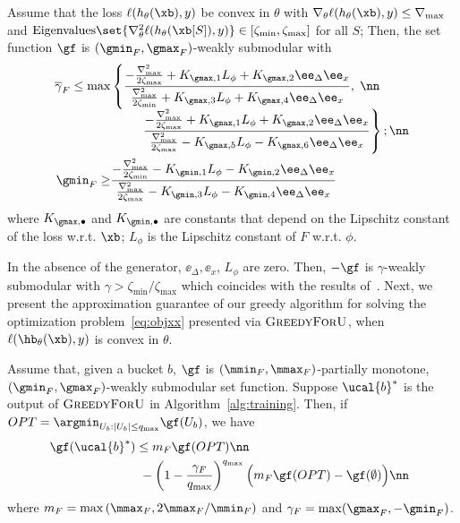 \documentclass[letterpaper]{article}
\renewcommand{\cite}{\citep}
\begin{document}
\begin{theorem} Assume that the loss $\ell(h_{\theta}(\xb),y)$  be convex in $\theta$ with
$\nabla_{\theta}\ell(h_{\theta}(\xb),y) \le \nabla_{\max}$
and $\text{Eigenvalues}\set{\nabla^2 _{\theta} \ell(h_{\theta}(\xb[S]),y)} \in [\zeta_{\min}, \zeta_{\max}]$ for all $S$;
Then,
\label{thm:sub}
the set function $\gf$  is $(\gmin_F,\gmax_F)$-weakly submodular
with
\begin{align}
 \hspace{-2mm}\overline{\gamma}_F \le \max&\left\{  \frac{   -\frac{\nabla_{\max} ^2}{2\zeta_{\max}}+ K_{\gmax,1} L_\phi  + K_{\gmax,2} \ee_{\Delta} \ee_x  }{\frac{\nabla_{\max} ^2}{2\zeta_{\min}}+ K_{\gmax,3} L_\phi   + K_{\gmax,4}  \ee_{\Delta} \ee_x   }, \right. \nn\\[-1ex]
& \qquad \ \left.  \frac{    -\frac{\nabla_{\max} ^2}{2\zeta_{\max}}+ K_{\gmax,1} L_\phi  + K_{\gmax,2} \ee_{\Delta} \ee_x  }{\frac{\nabla_{\max} ^2}{2\zeta_{\max}}- K_{\gmax,5}L_\phi -K_{\gmax,6} \ee_{\Delta} \ee_x  }
 \right\}; \nn\\
 \gmin_F \ge
& \frac{   -\frac{\nabla_{\max} ^2}{2\zeta_{\min}}- K_{\gmin,1} L_\phi - K_{\gmin,2} \ee_{\Delta} \ee_x  }{\frac{ \nabla_{\max} ^2}{2\zeta_{\max}}- K_{\gmin,3} L_\phi  -  K_{\gmin,4} \ee_{\Delta} \ee_x    }
\end{align}
where $K_{\gmax,\bullet}$ and $K_{\gmin, \bullet}$ are constants that depend on the Lipschitz constant of the loss w.r.t. $\xb$; $L_{\phi}$ is the Lipschitz constant of $F$ w.r.t. $\phi$.
\end{theorem}
In the absence of the generator, $\ee_\Delta, \ee_x$, $L_{\phi}$ are zero. Then, $-\gf$ is $\gamma$-weakly submodular with $\gamma > \zeta_{\min}/\zeta_{\max}$ which coincides with the results of~\cite{elenberg2018restricted}.
%
Next, we present the approximation guarantee of our greedy algorithm for solving the optimization problem~\eqref{eq:objxx} presented via $\textsc{GreedyForU}$, when $\ell(\hb_{\theta} (\xb),y)$ is convex in $\theta$.
\begin{theorem} Assume that, given a bucket $b$,  $\gf$ is  $(\mmin_F,\mmax_F)$-partially monotone, $(\gmin_F,\gmax_F)$-weakly submodular set function. Suppose $\ucal{b}^*$ is
the output of $\textsc{GreedyForU}$ in Algorithm~\ref{alg:training}. Then, if $OPT=\argmin_{U_b: |U_b|\le{q_{\max}}} \gf(U_b)  $, we have
\begin{align}
\hspace{-2mm}\gf(\ucal{b}^*) & \le   m_F \gf(OPT)\nn\\
& \  -\left(1-\frac{\gamma_F}{q_{\max}} \right)^{q_{\max}} \Big(m_F \gf(OPT)-\gf(\emptyset)\Big) \nn
\end{align}
where $m_F=\max\left(\mmax_F, 2\mmax_F/\mmin_F \right)$ and $\gamma_F = \max(\gmax_F,-\gmin_F)$.
\label{thm:greedy}
\end{theorem}
\end{document}
